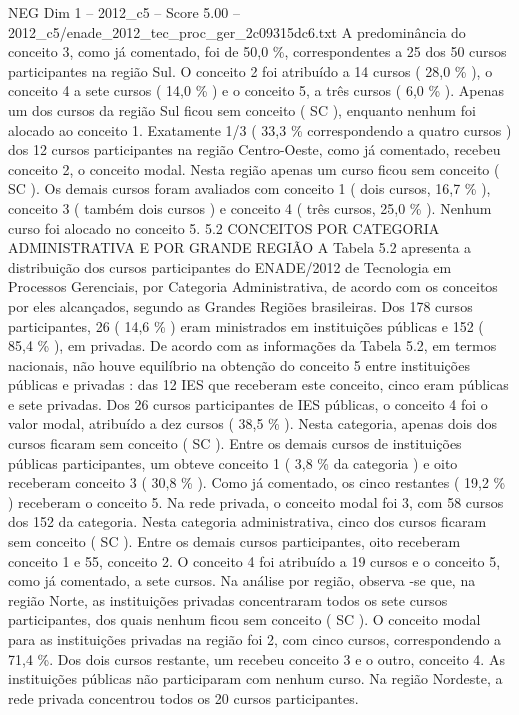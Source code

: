 \begin{textsample}{NEG Dim 1 – 2012\_c5 – Score 5.00 – 2012\_c5/enade\_2012\_tec\_proc\_ger\_2c09315dc6.txt}
A predominância do conceito 3, como já comentado, foi de 50,0 \%, correspondentes a 25 dos 50 cursos participantes na região Sul.
O conceito 2 foi atribuído a 14 cursos ( 28,0 \% ), o conceito 4 a sete cursos ( 14,0 \% ) e o conceito 5, a três cursos ( 6,0 \% ).
Apenas um dos cursos da região Sul ficou sem conceito ( SC ), enquanto nenhum foi alocado ao conceito 1.
Exatamente 1/3 ( 33,3 \% correspondendo a quatro cursos ) dos 12 cursos participantes na região Centro-Oeste, como já comentado, recebeu conceito 2, o conceito modal.
Nesta região apenas um curso ficou sem conceito ( SC ).
Os demais cursos foram avaliados com conceito 1 ( dois cursos, 16,7 \% ), conceito 3 ( também dois cursos ) e conceito 4 ( três cursos, 25,0 \% ).
Nenhum curso foi alocado no conceito 5. 5.2 CONCEITOS POR CATEGORIA ADMINISTRATIVA E POR GRANDE REGIÃO A Tabela 5.2 apresenta a distribuição dos cursos participantes do ENADE/2012 de Tecnologia em Processos Gerenciais, por Categoria Administrativa, de acordo com os conceitos por eles alcançados, segundo as Grandes Regiões brasileiras.
Dos 178 cursos participantes, 26 ( 14,6 \% ) eram ministrados em instituições públicas e 152 ( 85,4 \% ), em privadas.
De acordo com as informações da Tabela 5.2, em termos nacionais, não houve equilíbrio na obtenção do conceito 5 entre instituições públicas e privadas : das 12 IES que receberam este conceito, cinco eram públicas e sete privadas.
Dos 26 cursos participantes de IES públicas, o conceito 4 foi o valor modal, atribuído a dez cursos ( 38,5 \% ).
Nesta categoria, apenas dois dos cursos ficaram sem conceito ( SC ).
Entre os demais cursos de instituições públicas participantes, um obteve conceito 1 ( 3,8 \% da categoria ) e oito receberam conceito 3 ( 30,8 \% ).
Como já comentado, os cinco restantes ( 19,2 \% ) receberam o conceito 5.
Na rede privada, o conceito modal foi 3, com 58 cursos dos 152 da categoria.
Nesta categoria administrativa, cinco dos cursos ficaram sem conceito ( SC ).
Entre os demais cursos participantes, oito receberam conceito 1 e 55, conceito 2.
O conceito 4 foi atribuído a 19 cursos e o conceito 5, como já comentado, a sete cursos.
Na análise por região, observa -se que, na região Norte, as instituições privadas concentraram todos os sete cursos participantes, dos quais nenhum ficou sem conceito ( SC ).
O conceito modal para as instituições privadas na região foi 2, com cinco cursos, correspondendo a 71,4 \%.
Dos dois cursos restante, um recebeu conceito 3 e o outro, conceito 4.
As instituições públicas não participaram com nenhum curso.
Na região Nordeste, a rede privada concentrou todos os 20 cursos participantes.

\end{textsample}
